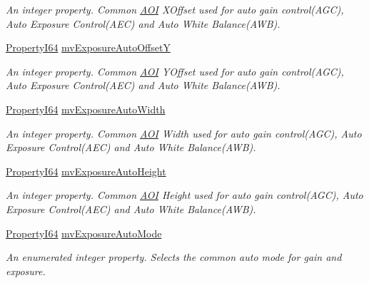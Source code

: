 \begin{DoxyCompactItemize}
\begin{DoxyCompactList}\small\item\em An integer property. Common \hyperlink{struct_a_o_i}{A\+O\+I} X\+Offset used for auto gain control(\+A\+G\+C), Auto Exposure Control(\+A\+E\+C) and Auto White Balance(\+A\+W\+B). \end{DoxyCompactList}\item 
\hyperlink{group___common_interface_ga81749b2696755513663492664a18a893}{Property\+I64} \hyperlink{classmv_i_m_p_a_c_t_1_1acquire_1_1_gen_i_cam_1_1_acquisition_control_aed46caaafedd6a8089cd33fe5c5fb7df}{mv\+Exposure\+Auto\+Offset\+Y}
\begin{DoxyCompactList}\small\item\em An integer property. Common \hyperlink{struct_a_o_i}{A\+O\+I} Y\+Offset used for auto gain control(\+A\+G\+C), Auto Exposure Control(\+A\+E\+C) and Auto White Balance(\+A\+W\+B). \end{DoxyCompactList}\item 
\hyperlink{group___common_interface_ga81749b2696755513663492664a18a893}{Property\+I64} \hyperlink{classmv_i_m_p_a_c_t_1_1acquire_1_1_gen_i_cam_1_1_acquisition_control_a06d1fcc8caea1f2e40d74865c48b39d2}{mv\+Exposure\+Auto\+Width}
\begin{DoxyCompactList}\small\item\em An integer property. Common \hyperlink{struct_a_o_i}{A\+O\+I} Width used for auto gain control(\+A\+G\+C), Auto Exposure Control(\+A\+E\+C) and Auto White Balance(\+A\+W\+B). \end{DoxyCompactList}\item 
\hyperlink{group___common_interface_ga81749b2696755513663492664a18a893}{Property\+I64} \hyperlink{classmv_i_m_p_a_c_t_1_1acquire_1_1_gen_i_cam_1_1_acquisition_control_ac5e32fc9dbfc9ca6dae425bfe40aa228}{mv\+Exposure\+Auto\+Height}
\begin{DoxyCompactList}\small\item\em An integer property. Common \hyperlink{struct_a_o_i}{A\+O\+I} Height used for auto gain control(\+A\+G\+C), Auto Exposure Control(\+A\+E\+C) and Auto White Balance(\+A\+W\+B). \end{DoxyCompactList}\item 
\hyperlink{group___common_interface_ga81749b2696755513663492664a18a893}{Property\+I64} \hyperlink{classmv_i_m_p_a_c_t_1_1acquire_1_1_gen_i_cam_1_1_acquisition_control_ac30d4c1772562361d0ed6a2e5c113aa4}{mv\+Exposure\+Auto\+Mode}
\begin{DoxyCompactList}\small\item\em An enumerated integer property. Selects the common auto mode for gain and exposure. \end{DoxyCompactList}\item 

\end{DoxyCompactItemize}
